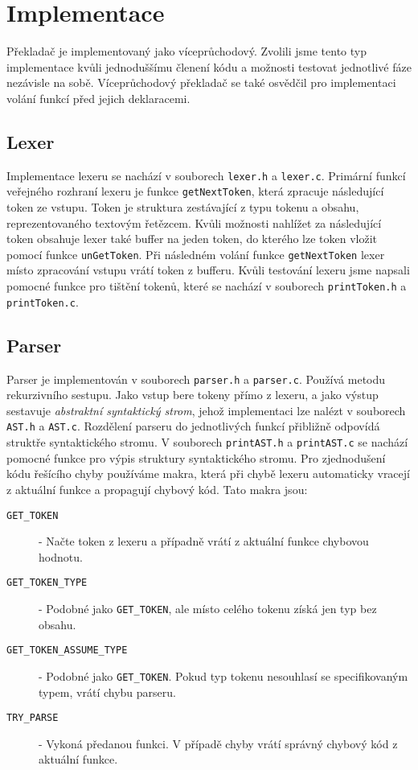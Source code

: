 \section{Implementace}
Překladač je implementovaný jako víceprůchodový.
Zvolili jsme tento typ implementace kvůli jednoduššímu členení kódu a možnosti testovat jednotlivé fáze nezávisle na sobě.
Víceprůchodový překladač se také osvědčil pro implementaci volání funkcí před jejich deklaracemi.

\subsection{Lexer}
Implementace lexeru se nachází v souborech \texttt{lexer.h} a \texttt{lexer.c}.
Primární funkcí veřejného rozhraní lexeru je funkce \texttt{getNextToken},
která zpracuje následující token ze vstupu.
Token je struktura zestávající z typu tokenu a obsahu, reprezentovaného textovým řetězcem.
Kvůli možnosti nahlížet za následující token obsahuje lexer také buffer na jeden token,
do kterého lze token vložit pomocí funkce \texttt{unGetToken}.
Při následném volání funkce \texttt{getNextToken} lexer místo zpracování vstupu vrátí token z bufferu.
Kvůli testování lexeru jsme napsali pomocné funkce pro tištění tokenů,
které se nachází v souborech \texttt{printToken.h} a \texttt{printToken.c}.

\subsection{Parser}
Parser je implementován v souborech \texttt{parser.h} a \texttt{parser.c}.
Používá metodu rekurzivního sestupu.
Jako vstup bere tokeny přímo z lexeru, a jako výstup sestavuje \textit{abstraktní syntaktický strom},
jehož implementaci lze nalézt v souborech \texttt{AST.h} a \texttt{AST.c}.
Rozdělení parseru do jednotlivých funkcí přibližně odpovídá struktře syntaktického stromu.
V souborech \texttt{printAST.h} a \texttt{printAST.c} se nachází pomocné funkce pro výpis struktury syntaktického stromu.
Pro zjednodušení kódu řešícího chyby používáme makra,
která při chybě lexeru automaticky vracejí z aktuální funkce a propagují chybový kód. Tato makra jsou:

\begin{description}
\item[\texttt{GET\_TOKEN}] - Načte token z lexeru a případně vrátí z aktuální funkce chybovou hodnotu.
\item[\texttt{GET\_TOKEN\_TYPE}] - Podobné jako \texttt{GET\_TOKEN}, ale místo celého tokenu získá jen typ bez obsahu.
\item[\texttt{GET\_TOKEN\_ASSUME\_TYPE}] - Podobné jako \texttt{GET\_TOKEN}. Pokud typ tokenu nesouhlasí se specifikovaným typem, vrátí chybu parseru.
\item[\texttt{TRY\_PARSE}] - Vykoná předanou funkci. V případě chyby vrátí správný chybový kód z aktuální funkce.
\end{description}

